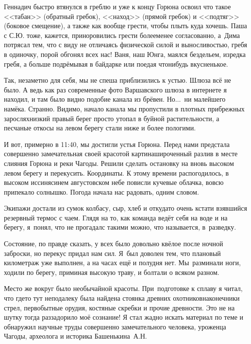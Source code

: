 Геннадич быстро втянулся в греблю и уже к концу Горюна освоил что такое <<табан>> (обратный гребок), <<наход>> (прямой гребок) и <<подтяг>> (боковое смещение), а также как вообще грести, чтобы плыть куда хочешь. Паша с С.Ю. тоже, кажется, приноровились грести более\sdash менее согласованно, а~Дима потрясал тем, что с виду не отличаясь физической силой и выносливостью, гребя в одиночку, порой обгонял всех нас! Ваня, наш Юнга, маялся бездельем, изредка гребя, а больше подрёмывая в байдарке или поедая что\sdash нибудь вкусненькое. 

Так, незаметно для себя, мы не спеша приблизились к устью. Шлюза всё не было. А ведь как раз современные фото Варшавского шлюза в интернете я находил, и там было видно подобие канала из брёвен. Но$\ldots$~ни малейшего намёка. Странно. Видимо, начало канала мы пропустили в плотных прибрежных зарослях\mdash низкий правый берег просто утопал в буйной растительности, а песчаные откосы на левом берегу стали ниже и более пологими. 

И вот, примерно в 11:40, мы достигли устья Горюна. Перед нами предстала совершенно замечательная своей красотой картина\mdash широченный разлив в месте слияния Горюна и реки Чагоды. Решили сделать остановку на вновь высоком левом берегу и перекусить. Координаты\mdash \CoordsGorunSixteenUstie. К этому времени распогодилось, в высоком иссиня\sdash синем августовском небе повисли кучевые облачка, вовсю припекало солнышко. Погода начала нас радовать, одним словом. 

Экипажи достали из сумок колбасу, сыр, хлеб и откуда\sdash то очень кстати взявшийся резервный термос с чаем. Глядя на то, как команда ведёт себя на воде и на берегу, я~понял, что не прогадал\mdash с такими можно, что называется, в~разведку. 

Состояние, по правде сказать, у всех было довольно квёлое после ночной заброски, но перекус придал нам сил. Я~был доволен тем, что плановый километраж уже выполнен, а на часах ещё и полудня нет. Мы~разминали ноги, ходили по берегу, приминая высокую траву, и болтали о всяком разном.

Место же вокруг было необычайной красоты. При~подготовке к сплаву я читал, что где\sdash то тут неподалеку была найдена стоянка древних охотников\mdash наконечники стрел, первобытные орудия, костяные скребки и прочие древности. Это не на шутку тогда раззадорило моё сознание! Я стал жадно искать материал по теме и обнаружил научные труды совершенно замечательного человека, уроженца Чагоды, археолога и историка Башенькина~А.Н. 

